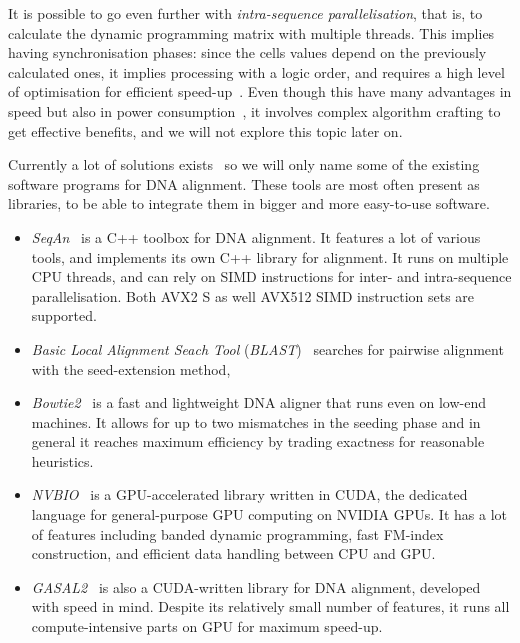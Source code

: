 It is possible to go even further with \emph{intra-sequence parallelisation}, that is, to calculate the dynamic programming matrix with multiple threads. This implies having synchronisation phases: since the cells values depend on the previously calculated ones, it implies processing with a logic order, and requires a high level of optimisation for efficient speed-up~\cite{Houtgast:gpu-accelerated}. Even though this have many advantages in speed but also in power consumption~\cite{Houtgast:power-efficiency}, it involves complex algorithm crafting to get effective benefits, and we will not explore this topic later on.

Currently a lot of solutions exists~\cite{wiki:ListAlignmentSoft} so we will only name some of the existing software programs for DNA alignment. These tools are most often present as libraries, to be able to integrate them in bigger and more easy-to-use software.

\begin{itemize}
    \item \emph{SeqAn}~\cite{Doring:seqan} is a C++ toolbox for DNA alignment. It features a lot of various tools, and implements its own C++ library for alignment. It runs on multiple CPU threads, and can rely on SIMD instructions for inter- and intra-sequence parallelisation. Both AVX2 S as well AVX512 SIMD instruction sets are supported.
    \item \emph{Basic Local Alignment Seach Tool} (\emph{BLAST})~\cite{Altschul:BLAST} searches for pairwise alignment with the seed-extension method,
    \item \emph{Bowtie2}~\cite{Langmead:bowtie} is a fast and lightweight DNA aligner that runs even on low-end machines. It allows for up to two mismatches in the seeding phase and in general it reaches maximum efficiency by trading exactness for reasonable heuristics.
    \item \emph{NVBIO}~\cite{nvidia:nvbio} is a GPU-accelerated library written in CUDA, the dedicated language for general-purpose GPU computing on NVIDIA GPUs. It has a lot of features including banded dynamic programming, fast FM-index construction, and efficient data handling between CPU and GPU.
    \item \emph{GASAL2}~\cite{Ahmed:gasal2} is also a CUDA-written library for DNA alignment, developed with speed in mind. Despite its relatively small number of features, it runs all compute-intensive parts on GPU for maximum speed-up.
\end{itemize}


